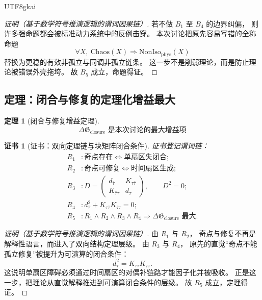 \documentclass[12pt]{article}
\newtheorem{theorem}{定理}[section]
\newtheorem{Certificate}{证书}[section]
\begin{document}
\begin{CJK*}{UTF8}{gkai}
\begin{proof}[证明（基于数学符号推演逻辑的谓词因果链）]
若不做 $B_1$ 至 $B_4$ 的边界纠偏，
则许多强命题都会被标准动力系统中的反例击穿。
本次讨论把原先容易写错的全称命题
\[
  \forall X,\ \mathrm{Chaos}(X)\Rightarrow \mathrm{NonIso}_{\mathrm{phys}}(X)
\]
替换为更稳的有效非孤立与同调非孤立链条。
这一步不是削弱理论，而是防止理论被错误外壳拖垮。
故 $B_5$ 成立，命题得证。
\end{proof}

\subsection{定理：闭合与修复的定理化增益最大}
\label{subsec:tex43-ch11-theorem-closure}

\begin{theorem}[闭合与修复增益定理]
\label{thm:tex43-gain-closure}
\[
  \boxed{
    \Delta \mathfrak G_{\mathrm{closure}} \text{ 是本次讨论的最大增益项}
  }
\]
\end{theorem}

\begin{Certificate}[证书：双向定理链与块矩阵闭合条件]
\label{cert:tex43-gain-closure}
证书登记谓词链：
\[
\begin{aligned}
  R_1 &: \text{奇点存在}
         \iff
         \text{单扇区失闭合};\\
  R_2 &: \text{奇点可修复}
         \iff
         \text{时间扇区生成};\\
  R_3 &: D=
         \begin{pmatrix}
           d_{\bar\tau} & K_{\tau\bar\tau}\\
           K_{\bar\tau\tau} & d_\tau
         \end{pmatrix},
         \qquad
         D^2=0;\\
  R_4 &: d_{\bar\tau}^2+K_{\tau\bar\tau}K_{\bar\tau\tau}=0;\\
  R_5 &: R_1\wedge R_2\wedge R_3\wedge R_4
         \Rightarrow
         \Delta \mathfrak G_{\mathrm{closure}} \text{ 最大}.
\end{aligned}
\]
\end{Certificate}

\begin{proof}[证明（基于数学符号推演逻辑的谓词因果链）]
由 $R_1$ 与 $R_2$，
奇点与修复不再是解释性语言，而进入了双向结构定理层级。
由 $R_3$ 与 $R_4$，
原先的直觉“奇点不能孤立修复”被提升为可演算的闭合条件：
\[
  d_{\bar\tau}^2
  =
  K_{\tau\bar\tau}K_{\bar\tau\tau}.
\]
这说明单扇区障碍必须通过时间扇区的对偶补链路才能因子化并被吸收。
正是这一步，把理论从直觉解释推进到可演算闭合条件的层级。
故 $R_5$ 成立，定理得证。
\end{proof}


\end{CJK*}
\end{document}
